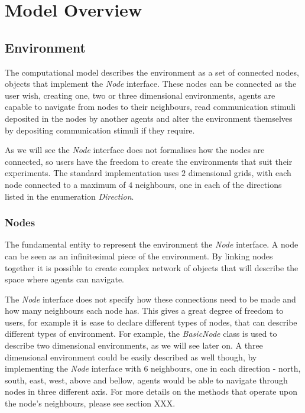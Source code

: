 
\chapter{Model Overview}
\label{ch:model-overview}

\section{Environment}

The computational model describes the environment as a set of connected nodes, objects that implement the \emph{Node} interface. These nodes can be connected as the user wish, creating one, two or three dimensional environments, agents are capable to navigate from nodes to their neighbours, read communication stimuli deposited in the nodes by another agents and alter the environment themselves by depositing communication stimuli if they require.

As we will see the \emph{Node} interface does not formalises how the nodes are connected, so users have the freedom to create the environments that suit their experiments. The standard implementation uses $2$ dimensional grids, with each node connected to a maximum of $4$ neighbours, one in each of the directions listed in the enumeration \emph{Direction}.

\subsection{Nodes}

The fundamental entity to represent the environment the \emph{Node} interface. A node can be seen as an infinitesimal piece of the environment. By linking nodes together it is possible to create complex network of objects that will describe the space where agents can navigate.

The \emph{Node} interface does not specify how these connections need to be made and how many neighbours each node has. This gives a great degree of freedom to users, for example it is ease to declare different types of nodes, that can describe different types of environment. For example, the \emph{BasicNode} class is used to describe two dimensional environments, as we will see later on. A three dimensional environment could be easily described as well though, by implementing the \emph{Node} interface with 6 neighbours, one in each direction - north, south, east, west, above and bellow, agents would be able to navigate through nodes in three different axis. For more details on the methods that operate upon the node's neighbours, please see section XXX.

